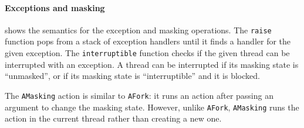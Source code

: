\paragraph{Exceptions and masking}
 shows the semantics for the exception and masking
operations.  The \verb|raise| function pops from a stack of exception
handlers until it finds a handler for the given exception.  The
\verb|interruptible| function checks if the given thread can be
interrupted with an exception.  A thread can be interrupted if its
masking state is ``unmasked'', or if its masking state is
``interruptible'' and it is blocked.

The \verb|AMasking| action is similar to \verb|AFork|: it runs an
action after passing an argument to change the masking state.
However, unlike \verb|AFork|, \verb|AMasking| runs the action in the
current thread rather than creating a new one.

